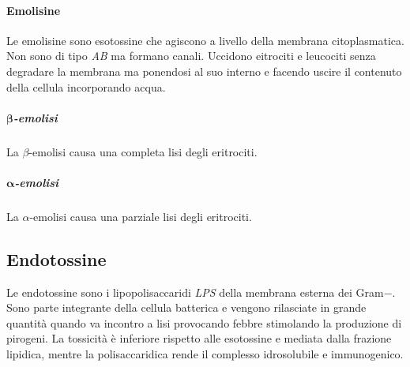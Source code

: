 			\paragraph{Emolisine}
			Le emolisine sono esotossine che agiscono a livello della membrana citoplasmatica. 
			Non sono di tipo \emph{AB} ma formano canali.
			Uccidono eitrociti e leucociti senza degradare la membrana ma ponendosi al suo interno e facendo uscire il contenuto della cellula incorporando acqua.

				\subparagraph{$\mathbf{\beta}$-emolisi}
				La $\beta$-emolisi causa una completa lisi degli eritrociti.

				\subparagraph{$\mathbf{\alpha}$-emolisi}
				La $\alpha$-emolisi causa una parziale lisi degli eritrociti.
				

	\subsection{Endotossine}
	Le endotossine sono i lipopolisaccaridi \emph{LPS} della membrana esterna dei Gram$-$.
	Sono parte integrante della cellula batterica e vengono rilasciate in grande quantit\`a quando va incontro a lisi provocando febbre stimolando la produzione di pirogeni.
	La tossicit\`a \`e inferiore rispetto alle esotossine e mediata dalla frazione lipidica, mentre la polisaccaridica rende il complesso idrosolubile e immunogenico.


